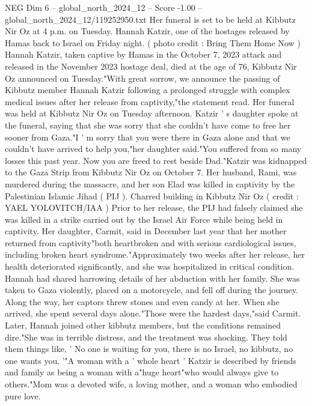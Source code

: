 \begin{textsample}{NEG Dim 6 – global\_north\_2024\_12 – Score -1.00 – global\_north\_2024\_12/119252950.txt}  \label{ex:f6_neg_188}
Her funeral is set to be held at Kibbutz Nir Oz at 4 p.m. on Tuesday.
Hannah Katzir, one of the hostages released by Hamas back to Israel on Friday night. ( photo credit : Bring Them Home Now ) Hannah Katzir, taken captive by Hamas in the October 7, 2023 attack and released in the November 2023 hostage deal, died at the age of 76, Kibbutz Nir Oz announced on Tuesday."With great sorrow, we announce the passing of Kibbutz member Hannah Katzir following a prolonged struggle with complex medical issues after her release from captivity,"the statement read.
Her funeral was held at Kibbutz Nir Oz on Tuesday afternoon.
Katzir ' s daughter spoke at the funeral, saying that she was sorry that she couldn't have come to free her sooner from Gaza."I ' m sorry that you were there in Gaza alone and that we couldn't have arrived to help you,"her daughter said."You suffered from so many losses this past year.
Now you are freed to rest beside Dad."Katzir was kidnapped to the Gaza Strip from Kibbutz Nir Oz on October 7.
Her husband, Rami, was murdered during the massacre, and her son Elad was killed in captivity by the Palestinian Islamic Jihad ( PIJ ).
Charred building in Kibbutz Nir Oz ( credit : YAEL YOLOVITCH/IAA ) Prior to her release, the PIJ had falsely claimed she was killed in a strike carried out by the Israel Air Force while being held in captivity.
Her daughter, Carmit, said in December last year that her mother returned from captivity"both heartbroken and with serious cardiological issues, including broken heart syndrome."Approximately two weeks after her release, her health deteriorated significantly, and she was hospitalized in critical condition.
Hannah had shared harrowing details of her abduction with her family.
She was taken to Gaza violently, placed on a motorcycle, and fell off during the journey.
Along the way, her captors threw stones and even candy at her.
When she arrived, she spent several days alone."Those were the hardest days,"said Carmit.
Later, Hannah joined other kibbutz members, but the conditions remained dire."She was in terrible distress, and the treatment was shocking.
They told them things like, ' No one is waiting for you, there is no Israel, no kibbutz, no one wants you. '"A woman with a ' whole heart ' Katzir is described by friends and family as being a woman with a"huge heart"who would always give to others."Mom was a devoted wife, a loving mother, and a woman who embodied pure love.

\end{textsample}

